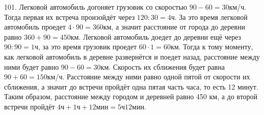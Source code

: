 101. Легковой автомобиль догоняет грузовик со скоростью $90-60=30$км/ч. Тогда первая их встреча произойдёт через $120:30=4$ч. За это время легковой автомобиль проедет $4\cdot90=360$км, а значит расстояние от города до деревни равно $360+90=450$км. Легковой автомобиль доедет до деревни ещё через $90:90=1$ч, за это время грузовик проедет $60\cdot1=60$км. Тогда к тому моменту, как легковой автомобиль в деревне развернётся и поедет назад, расстояние между ними будет равно $90-60=30$км. Скорость их сближения будет равна $90+60=150$км/ч. Расстояние между ними равно одной пятой от скорости их сближения, а значит до встречи пройдёт одна пятая часть часа, то есть 12 минут. Таким образом, расстояние между городом и деревней равно 450 км, а до второй встречи пройдёт $4\text{ч}+1\text{ч}+12\text{мин}=5\text{ч}12\text{мин}.$\\
